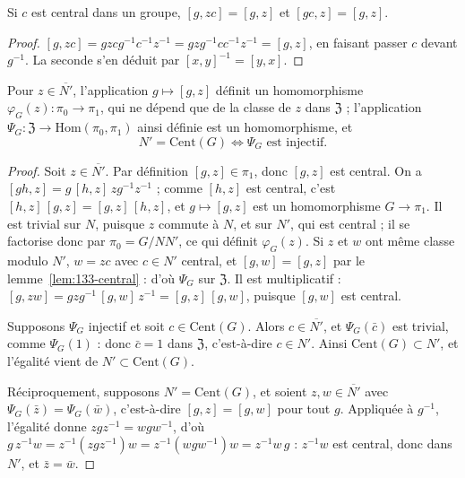 \begin{lemme}\label{lem:133-central}
Si $c$ est central dans un groupe, $[g, zc] = [g, z]$ et $[gc, z] = [g, z]$.
\end{lemme}

\begin{proof}
$[g, zc] = gzcg^{-1}c^{-1}z^{-1} = gzg^{-1}cc^{-1}z^{-1} = [g, z]$, en faisant passer $c$ devant $g^{-1}$. La seconde s'en déduit par $[x, y]^{-1} = [y, x]$.
\end{proof}

\begin{encadre}
\begin{theoreme}
Pour $z \in \overline{N'}$, l'application $g \mapsto [g, z]$ définit un homomorphisme $\varphi_G(z) : \pi_0 \to \pi_1$, qui ne dépend que de la classe de $z$ dans $\mathfrak Z$ ; l'application $\Psi_G : \mathfrak Z \to \mathrm{Hom}(\pi_0, \pi_1)$ ainsi définie est un homomorphisme, et
\[
N' = \mathrm{Cent}(G) \iff \Psi_G \text{ est injectif.}
\]
\end{theoreme}
\end{encadre}

\begin{proof}
Soit $z \in \overline{N'}$. Par définition $[g, z] \in \pi_1$, donc $[g, z]$ est central. On a $[gh, z] = g\,[h, z]\,zg^{-1}z^{-1}$ ; comme $[h, z]$ est central, c'est $[h, z]\,[g, z] = [g, z]\,[h, z]$, et $g \mapsto [g, z]$ est un homomorphisme $G \to \pi_1$. Il est trivial sur $N$, puisque $z$ commute à $N$, et sur $N'$, qui est central ; il se factorise donc par $\pi_0 = G/NN'$, ce qui définit $\varphi_G(z)$. Si $z$ et $w$ ont même classe modulo $N'$, $w = zc$ avec $c \in N'$ central, et $[g, w] = [g, z]$ par le lemme~\ref{lem:133-central} : d'où $\Psi_G$ sur $\mathfrak Z$. Il est multiplicatif : $[g, zw] = gzg^{-1}\,[g, w]\,z^{-1} = [g, z]\,[g, w]$, puisque $[g, w]$ est central.

Supposons $\Psi_G$ injectif et soit $c \in \mathrm{Cent}(G)$. Alors $c \in \overline{N'}$, et $\Psi_G(\bar c)$ est trivial, comme $\Psi_G(1)$ : donc $\bar c = 1$ dans $\mathfrak Z$, c'est-à-dire $c \in N'$. Ainsi $\mathrm{Cent}(G) \subset N'$, et l'égalité vient de $N' \subset \mathrm{Cent}(G)$.

Réciproquement, supposons $N' = \mathrm{Cent}(G)$, et soient $z, w \in \overline{N'}$ avec $\Psi_G(\bar z) = \Psi_G(\bar w)$, c'est-à-dire $[g, z] = [g, w]$ pour tout $g$. Appliquée à $g^{-1}$, l'égalité donne $zgz^{-1} = wgw^{-1}$, d'où $g\,z^{-1}w = z^{-1}(zgz^{-1})w = z^{-1}(wgw^{-1})w = z^{-1}w\,g$ : $z^{-1}w$ est central, donc dans $N'$, et $\bar z = \bar w$.
\end{proof}

